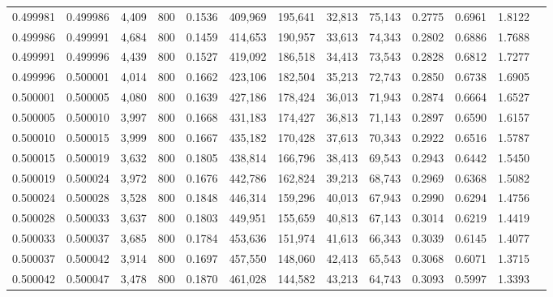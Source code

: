 \begin{tabular}{rrrrrrrrrrrrr}
0.499981 & 0.499986 &  4,409 &   800 &                                     0.1536 & 409,969 & 195,641 &  32,813 &  75,143 & 0.2775 & 0.6961 & 1.8122 \\
0.499986 & 0.499991 &  4,684 &   800 &                                     0.1459 & 414,653 & 190,957 &  33,613 &  74,343 & 0.2802 & 0.6886 & 1.7688 \\
0.499991 & 0.499996 &  4,439 &   800 &                                     0.1527 & 419,092 & 186,518 &  34,413 &  73,543 & 0.2828 & 0.6812 & 1.7277 \\
0.499996 & 0.500001 &  4,014 &   800 &                                     0.1662 & 423,106 & 182,504 &  35,213 &  72,743 & 0.2850 & 0.6738 & 1.6905 \\
0.500001 & 0.500005 &  4,080 &   800 &                                     0.1639 & 427,186 & 178,424 &  36,013 &  71,943 & 0.2874 & 0.6664 & 1.6527 \\
0.500005 & 0.500010 &  3,997 &   800 &                                     0.1668 & 431,183 & 174,427 &  36,813 &  71,143 & 0.2897 & 0.6590 & 1.6157 \\
0.500010 & 0.500015 &  3,999 &   800 &                                     0.1667 & 435,182 & 170,428 &  37,613 &  70,343 & 0.2922 & 0.6516 & 1.5787 \\
0.500015 & 0.500019 &  3,632 &   800 &                                     0.1805 & 438,814 & 166,796 &  38,413 &  69,543 & 0.2943 & 0.6442 & 1.5450 \\
0.500019 & 0.500024 &  3,972 &   800 &                                     0.1676 & 442,786 & 162,824 &  39,213 &  68,743 & 0.2969 & 0.6368 & 1.5082 \\
0.500024 & 0.500028 &  3,528 &   800 &                                     0.1848 & 446,314 & 159,296 &  40,013 &  67,943 & 0.2990 & 0.6294 & 1.4756 \\
0.500028 & 0.500033 &  3,637 &   800 &                                     0.1803 & 449,951 & 155,659 &  40,813 &  67,143 & 0.3014 & 0.6219 & 1.4419 \\
0.500033 & 0.500037 &  3,685 &   800 &                                     0.1784 & 453,636 & 151,974 &  41,613 &  66,343 & 0.3039 & 0.6145 & 1.4077 \\
0.500037 & 0.500042 &  3,914 &   800 &                                     0.1697 & 457,550 & 148,060 &  42,413 &  65,543 & 0.3068 & 0.6071 & 1.3715 \\
0.500042 & 0.500047 &  3,478 &   800 &                                     0.1870 & 461,028 & 144,582 &  43,213 &  64,743 & 0.3093 & 0.5997 & 1.3393 \\

\end{tabular}
